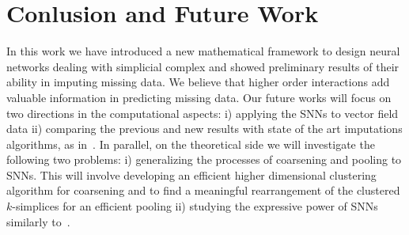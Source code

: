 \section{Conlusion and Future Work}

In this work we have introduced a new mathematical framework to design neural networks dealing with simplicial complex and showed preliminary results of their ability in imputing missing data. We believe that higher order interactions add valuable information in predicting missing data.
Our future works will focus on two directions in the computational aspects:  i) applying the SNNs to vector field data ii) comparing the previous and new results with state of the art imputations algorithms, as in~\cite{spinelli2020neural}. 
In parallel, on the theoretical side we will investigate the following two problems: i) generalizing the processes of coarsening and pooling to SNNs. This will involve developing an efficient higher dimensional clustering algorithm for coarsening and to find a meaningful rearrangement of the clustered $k$-simplices for an efficient pooling ii) studying the expressive power of SNNs similarly to~\cite{morris2019weisfeiler}.



